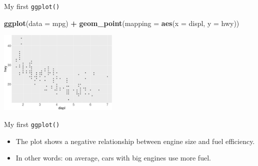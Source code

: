 \documentclass[ignorenonframetext,]{beamer}
\newenvironment{Shaded}{\begin{snugshade}}{\end{snugshade}}
\newcommand{\DataTypeTok}[1]{\textcolor[rgb]{0.13,0.29,0.53}{#1}}
\newcommand{\KeywordTok}[1]{\textcolor[rgb]{0.13,0.29,0.53}{\textbf{#1}}}
\newcommand{\NormalTok}[1]{#1}
\newcommand{\OperatorTok}[1]{\textcolor[rgb]{0.81,0.36,0.00}{\textbf{#1}}}
\newcommand{\StringTok}[1]{\textcolor[rgb]{0.31,0.60,0.02}{#1}}
\begin{document}
\begin{frame}[fragile]{My first \texttt{ggplot()}}
\protect\hypertarget{my-first-ggplot-1}{}

\begin{Shaded}
\begin{Highlighting}[]
\KeywordTok{ggplot}\NormalTok{(}\DataTypeTok{data =}\NormalTok{ mpg) }\OperatorTok{+}
\StringTok{  }\KeywordTok{geom_point}\NormalTok{(}\DataTypeTok{mapping =} \KeywordTok{aes}\NormalTok{(}\DataTypeTok{x =}\NormalTok{ displ, }\DataTypeTok{y =}\NormalTok{ hwy))}
\end{Highlighting}
\end{Shaded}

\begin{center}\includegraphics[height=150px]{data-visualization_files/figure-beamer/unnamed-chunk-3-1} \end{center}

\end{frame}

\begin{frame}{My first \texttt{ggplot()}}
\protect\hypertarget{my-first-ggplot-2}{}

\begin{itemize}
\item
  The plot shows a negative relationship between engine size and fuel
  efficiency.
\item
  In other words: on average, cars with big engines use more fuel.
\end{itemize}

\end{frame}
\end{document}
